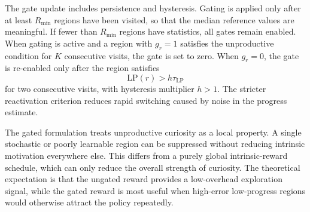 The gate update includes persistence and hysteresis.
Gating is applied only after at least $R_{\min}$ regions have been visited, so that the median reference values are meaningful.
If fewer than $R_{\min}$ regions have statistics, all gates remain enabled.
When gating is active and a region with $g_r=1$ satisfies the unproductive condition for $K$ consecutive visits, the gate is set to zero.
When $g_r=0$, the gate is re-enabled only after the region satisfies
\begin{equation}
    \mathrm{LP}(r)>h\tau_{\mathrm{LP}}
\end{equation}
for two consecutive visits, with hysteresis multiplier $h>1$.
The stricter reactivation criterion reduces rapid switching caused by noise in the progress estimate.

The gated formulation treats unproductive curiosity as a local property.
A single stochastic or poorly learnable region can be suppressed without reducing intrinsic motivation everywhere else.
This differs from a purely global intrinsic-reward schedule, which can only reduce the overall strength of curiosity.
The theoretical expectation is that the ungated reward provides a low-overhead exploration signal, while the gated reward is most useful when high-error low-progress regions would otherwise attract the policy repeatedly.
